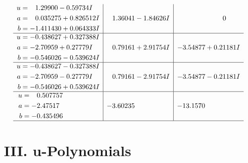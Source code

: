 \documentclass[1p]{elsarticle_modified}
\theoremstyle{definition}
\begin{document}
$$\begin{array}{c|c|c}
\begin{aligned}
u &= \phantom{-}1.29900 - 0.59734 I \\
a &= \phantom{-}0.035275 + 0.826512 I \\
b &= -1.411430 + 0.064333 I\end{aligned}
 & \phantom{-}1.36041 - 1.84626 I & \phantom{-0.000000 } 0 \\ \hline\begin{aligned}
u &= -0.438627 + 0.327388 I \\
a &= -2.70959 + 0.27779 I \\
b &= -0.546026 - 0.539624 I\end{aligned}
 & \phantom{-}0.79161 + 2.91754 I & -3.54877 + 0.21181 I \\ \hline\begin{aligned}
u &= -0.438627 - 0.327388 I \\
a &= -2.70959 - 0.27779 I \\
b &= -0.546026 + 0.539624 I\end{aligned}
 & \phantom{-}0.79161 - 2.91754 I & -3.54877 - 0.21181 I \\ \hline\begin{aligned}
u &= \phantom{-}0.507757\phantom{ +0.000000I} \\
a &= -2.47517\phantom{ +0.000000I} \\
b &= -0.435496\phantom{ +0.000000I}\end{aligned}
 & -3.60235\phantom{ +0.000000I} & -13.1570\phantom{ +0.000000I}\\
 \hline 
 \end{array}$$\newpage
\newpage\renewcommand{\arraystretch}{1}
\centering \section*{ III. u-Polynomials}
\end{document}
